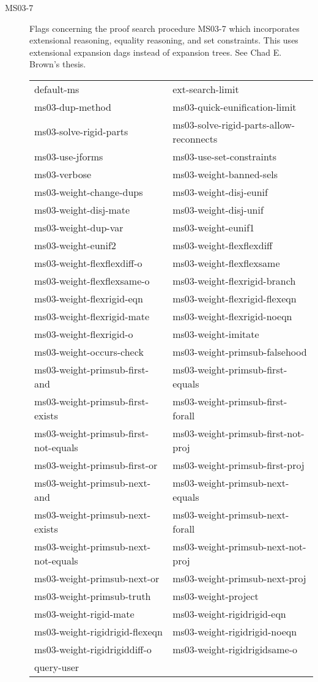 \begin{description}
\item[MS03-7]  
Flags concerning the proof search procedure MS03-7 which incorporates
extensional reasoning, equality reasoning, and set constraints.  This uses
extensional expansion dags instead of expansion trees.  See Chad E. Brown's thesis.

\begin{tabular}{l l}
default-ms&ext-search-limit\\
ms03-dup-method&ms03-quick-eunification-limit\\
ms03-solve-rigid-parts&ms03-solve-rigid-parts-allow-reconnects\\
ms03-use-jforms&ms03-use-set-constraints\\
ms03-verbose&ms03-weight-banned-sels\\
ms03-weight-change-dups&ms03-weight-disj-eunif\\
ms03-weight-disj-mate&ms03-weight-disj-unif\\
ms03-weight-dup-var&ms03-weight-eunif1\\
ms03-weight-eunif2&ms03-weight-flexflexdiff\\
ms03-weight-flexflexdiff-o&ms03-weight-flexflexsame\\
ms03-weight-flexflexsame-o&ms03-weight-flexrigid-branch\\
ms03-weight-flexrigid-eqn&ms03-weight-flexrigid-flexeqn\\
ms03-weight-flexrigid-mate&ms03-weight-flexrigid-noeqn\\
ms03-weight-flexrigid-o&ms03-weight-imitate\\
ms03-weight-occurs-check&ms03-weight-primsub-falsehood\\
ms03-weight-primsub-first-and&ms03-weight-primsub-first-equals\\
ms03-weight-primsub-first-exists&ms03-weight-primsub-first-forall\\
ms03-weight-primsub-first-not-equals&ms03-weight-primsub-first-not-proj\\
ms03-weight-primsub-first-or&ms03-weight-primsub-first-proj\\
ms03-weight-primsub-next-and&ms03-weight-primsub-next-equals\\
ms03-weight-primsub-next-exists&ms03-weight-primsub-next-forall\\
ms03-weight-primsub-next-not-equals&ms03-weight-primsub-next-not-proj\\
ms03-weight-primsub-next-or&ms03-weight-primsub-next-proj\\
ms03-weight-primsub-truth&ms03-weight-project\\
ms03-weight-rigid-mate&ms03-weight-rigidrigid-eqn\\
ms03-weight-rigidrigid-flexeqn&ms03-weight-rigidrigid-noeqn\\
ms03-weight-rigidrigiddiff-o&ms03-weight-rigidrigidsame-o\\
query-user
\end{tabular}


\end{description}
